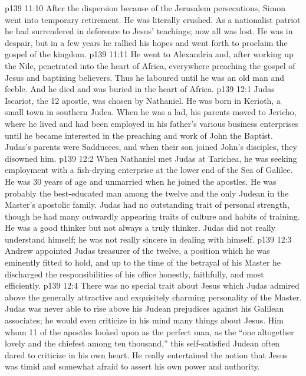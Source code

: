 \vs p139 11:10 \pc After the dispersion because of the Jerusalem persecutions, Simon went into temporary retirement. He was literally crushed. As a nationalist patriot he had surrendered in deference to Jesus’ teachings; now all was lost. He was in despair, but in a few years he rallied his hopes and went forth to proclaim the gospel of the kingdom.
\vs p139 11:11 He went to Alexandria and, after working up the Nile, penetrated into the heart of Africa, everywhere preaching the gospel of Jesus and baptizing believers. Thus he laboured until he was an old man and feeble. And he died and was buried in the heart of Africa.
\vs p139 12:1 Judas Iscariot, the 12 apostle, was chosen by Nathaniel. He was born in Kerioth, a small town in southern Judea. When he was a lad, his parents moved to Jericho, where he lived and had been employed in his father’s various business enterprises until he became interested in the preaching and work of John the Baptist. Judas’s parents were Sadducees, and when their son joined John’s disciples, they disowned him.
\vs p139 12:2 \pc When Nathaniel met Judas at Tarichea, he was seeking employment with a fish\hyp{}drying enterprise at the lower end of the Sea of Galilee. He was 30 years of age and unmarried when he joined the apostles. He was probably the best\hyp{}educated man among the twelve and the only Judean in the Master’s apostolic family. Judas had no outstanding trait of personal strength, though he had many outwardly appearing traits of culture and habits of training. He was a good thinker but not always a truly  thinker. Judas did not really understand himself; he was not really sincere in dealing with himself.
\vs p139 12:3 Andrew appointed Judas treasurer of the twelve, a position which he was eminently fitted to hold, and up to the time of the betrayal of his Master he discharged the responsibilities of his office honestly, faithfully, and most efficiently.
\vs p139 12:4 \pc There was no special trait about Jesus which Judas admired above the generally attractive and exquisitely charming personality of the Master. Judas was never able to rise above his Judean prejudices against his Galilean associates; he would even criticize in his mind many things about Jesus. Him whom 11 of the apostles looked upon as the perfect man, as the “one altogether lovely and the chiefest among ten thousand,” this self\hyp{}satisfied Judean often dared to criticize in his own heart. He really entertained the notion that Jesus was timid and somewhat afraid to assert his own power and authority.
